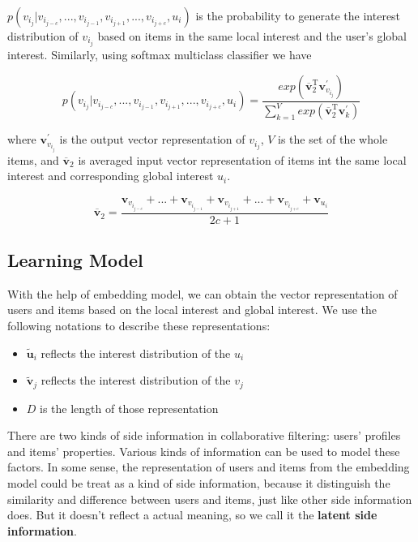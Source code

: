 \documentclass{sig-alternate-05-2015}
\begin{document}
$p(v_{i_j} | v_{i_{j-c}}, ..., v_{i_{j-1}}, v_{i_{j+1}},..., v_{i_{j+c}}, u_i)$
is the probability to generate the interest distribution of $v_{i_j}$
based on items in the same local interest and the user's global interest.
Similarly, using softmax multiclass classifier we have

\begin{equation}
	p(v_{i_j} | v_{i_{j-c}}, ..., v_{i_{j-1}}, v_{i_{j+1}},..., v_{i_{j+c}}, u_i) =
	\frac
	{
		exp( \overline{\mathbf{v}}_{2}^{\mathrm{T}} \mathbf{v}_{v_{i_j}}^{'} )
	}
	{
		\sum_{k=1}^{V} exp( \overline{\mathbf{v}}_{2}^{\mathrm{T}} \mathbf{v}_{k}^{'} )
	}
\end{equation}

where $\mathbf{v}_{v_{i_j}}^{'}$ is the output vector representation of $v_{i_j}$,
$V$ is the set of the whole items,
and $\overline{\mathbf{v}}_{2}$ is averaged input vector representation of items
int the same local interest and corresponding global interest $u_i$.

\begin{equation}
	\overline{\mathbf{v}}_{2} = \frac{ \mathbf{v}_{v_{i_{j-c}}} + ... + \mathbf{v}_{v_{i_{j-1}}} + 
	\mathbf{v}_{v_{i_{j+1}}} + ... + \mathbf{v}_{v_{i_{j+c}}} + \mathbf{v}_{u_i} }{2c+1}
\end{equation}


\subsection{Learning Model}
With the help of embedding model, we can obtain
the vector representation of users and items
based on the local interest and global interest.
We use the following notations to describe these representations:

\begin{itemize}
	\item $\tilde{\mathbf{u}}_i$ reflects the interest distribution of the $u_i$
	\item $\tilde{\mathbf{v}}_j$ reflects the interest distribution of the $v_j$
	\item $D$ is the length of those representation
\end{itemize}

There are two kinds of side information in collaborative filtering:
users' profiles and items' properties.
Various kinds of information can be used to model these factors.
In some sense, the representation of users and items from the embedding model
could be treat as a kind of side information,
because it distinguish the similarity and difference between users and items,
just like other side information does.
But it doesn't reflect a actual meaning, so we call it the \textbf{latent side information}. 
\end{document}
